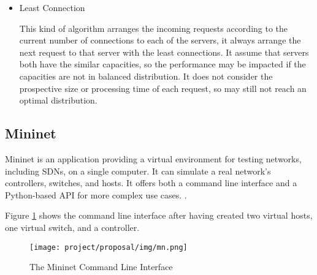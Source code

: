 \begin{itemize}
    \item Least Connection
    
    This kind of algorithm arranges the incoming requests according to the current number of connections to each of the servers, it always arrange the next request to that server with the least connections. It assume that servers both have the similar capacities, so the performance may be impacted if the capacities are not in balanced distribution\cite{loadBalancingAlgorithms}. It does not consider the prospective size or processing time of each request, so may still not reach an optimal distribution. 
    
\end{itemize}

\subsection{Mininet}

Mininet is an application providing a virtual environment for testing networks, including SDNs, on a single computer. It can simulate a real network's controllers, switches, and hosts. It offers both a command line interface and a Python-based API for more complex use cases. \cite{Mininet}.

Figure \ref{fig:mn} shows the command line interface after having created two virtual hosts, one virtual switch, and a controller.


\begin{figure}[H]
    \centering
    \texttt{[image: project/proposal/img/mn.png]}
    \caption{The Mininet Command Line Interface}
    \label{fig:mn}
\end{figure}